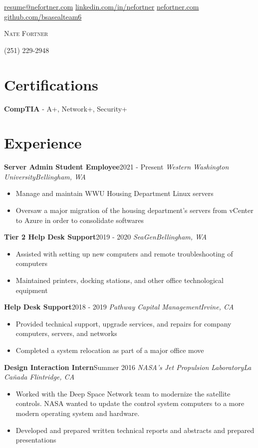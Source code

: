 \documentclass{article}
\newcommand{\alignicon}[2][nmbr]{\eqmakebox[#1]{\strut #2}}
\newcommand{\topLevelItem}[4]{
    \textbf{#1}\hfill #4\newline
    \emph{#2\hfill #3}\newline
    \vspace{-18pt}\begin{itemize}
}
\newcommand{\certificationType}[2]{
    \textbf{#1} - #2
}
\newcommand{\topLevelItemEnd}{\end{itemize}\vspace{5pt}}
\newcommand{\lowLevelItem}[1]{
    \item\small{#1}\vspace{-8pt}
}
\begin{document}
    \begin{center}
        \noindent\alignicon\faEnvelope\quad\href{mailto:resume@nefortner.com}{resume@nefortner.com}\hfill %
        \href{https://linkedin.com/in/nefortner}{linkedin.com/in/nefortner}\quad\alignicon\faLinkedin\newline %
        \alignicon\faGlobe\quad\href{https://nefortner.com}{nefortner.com}\hfill %
        \href{https://github.com/bsasealteam6}{github.com/bsasealteam6}\quad\alignicon\faGithub\vspace*{-0.33in} %
        
        {\fontsize{28}{0}\selectfont\scshape Nate Fortner}
    \end{center}
    \begin{center}
        (251) 229-2948\vspace{5pt}
    \end{center}
    \section*{Certifications}
        \certificationType{CompTIA}{A+, Network+, Security+}
    \section*{Experience}
        \topLevelItem{Server Admin Student Employee}{Western Washington University}{Bellingham, WA}{2021 - Present}
            \lowLevelItem{Manage and maintain WWU Housing Department Linux servers}
            \lowLevelItem{Oversaw a major migration of the housing department’s servers from vCenter to Azure in order to consolidate softwares}
        \topLevelItemEnd
        \topLevelItem{Tier 2 Help Desk Support}{SeaGen}{Bellingham, WA}{2019 - 2020}
            \lowLevelItem{Assisted with setting up new computers and remote troubleshooting of computers}
            \lowLevelItem{Maintained printers, docking stations, and other office technological equipment}
        \topLevelItemEnd
        \topLevelItem{Help Desk Support}{Pathway Capital Management}{Irvine, CA}{2018 - 2019}
            \lowLevelItem{Provided technical support, upgrade services, and repairs for company computers, servers, and networks}
            \lowLevelItem{Completed a system relocation as part of a major office move}
        \topLevelItemEnd
        \topLevelItem{Design Interaction Intern}{NASA's Jet Propulsion Laboratory}{La Ca\~{n}ada Flintridge, CA}{Summer 2016}
            \lowLevelItem{Worked with the Deep Space Network team to modernize the satellite controls. NASA wanted to update the control system computers to a more modern operating system and hardware.}
            \lowLevelItem{Developed and prepared written technical reports and abstracts and prepared presentations}
        \topLevelItemEnd
\end{document}
